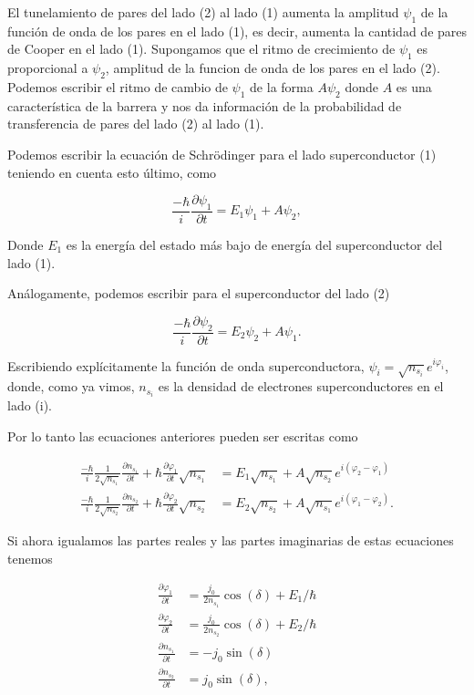 El tunelamiento de pares del lado (2) al lado (1) aumenta la amplitud $\psi_1$ de la función de onda de los pares en el lado (1), es decir, aumenta la cantidad de pares de Cooper en el lado (1). Supongamos que el ritmo de crecimiento de $\psi_1$ es proporcional a $\psi_2$, amplitud de la funcion de onda de los pares en el lado (2). Podemos escribir el ritmo de cambio de $\psi_1$ de la forma $A \psi_2$ donde $A$ es una característica de la barrera y nos da información de la probabilidad de transferencia de pares del lado (2) al lado (1).

Podemos escribir la ecuación de Schrödinger para el lado superconductor (1) teniendo en cuenta esto último, como

\begin{equation}
    \frac{-\hbar}{i} \frac{\partial \psi_1}{\partial t} = E_1 \psi_1 + A \psi_2 ,
\end{equation}

Donde $E_1$ es la energía del estado más bajo de energía del superconductor del lado (1).

Análogamente, podemos escribir para el superconductor del lado (2)

\begin{equation}
    \frac{-\hbar}{i} \frac{\partial \psi_2}{\partial t} = E_2 \psi_2 + A \psi_1 .
\end{equation}

Escribiendo explícitamente la función de onda superconductora, $\psi_i = \sqrt{n_{s_i}} e^{i \varphi_i}$, donde, como ya vimos, $n_{s_i}$ es la densidad de electrones superconductores en el lado (i).

Por lo tanto las ecuaciones anteriores pueden ser escritas como

\begin{align}
    \frac{-\hbar}{i} \frac{1}{2 \sqrt{n_{s_1}}} \frac{\partial n_{s_1}}{\partial t} + \hbar \frac{\partial \varphi_1}{\partial t} \sqrt{n_{s_1}} &= E_1 \sqrt{n_{s_1}} + A \sqrt{n_{s_2}} e^{i (\varphi_2 - \varphi_1)} \\
    \frac{-\hbar}{i} \frac{1}{2 \sqrt{n_{s_2}}} \frac{\partial n_{s_2}}{\partial t} + \hbar \frac{\partial \varphi_2}{\partial t} \sqrt{n_{s_2}} &= E_2 \sqrt{n_{s_2}} + A \sqrt{n_{s_1}} e^{i (\varphi_1 - \varphi_2)} .
\end{align}


Si ahora igualamos las partes reales y las partes imaginarias de estas ecuaciones tenemos

\begin{align}
    \frac{\partial \varphi_1}{\partial t} &= \frac{j_0}{2 n_{s_1}} \cos(\delta) + E_1/\hbar \\
    \frac{\partial \varphi_2}{\partial t} &= \frac{j_0}{2 n_{s_2}} \cos(\delta) + E_2/\hbar \\
    \frac{\partial n_{s_1}}{\partial t} &= -j_0 \sin(\delta) \\
    \frac{\partial n_{s_2}}{\partial t} &= j_0 \sin(\delta) ,
\end{align}

